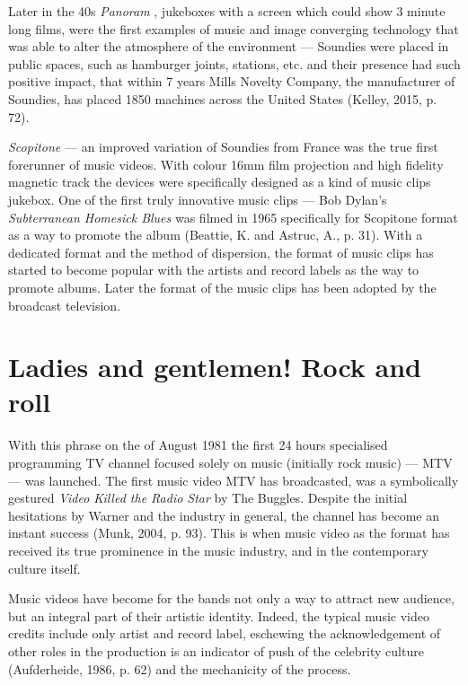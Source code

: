 \documentclass[a4paper, 11pt]{article}
\begin{document}
Later in the 40s \textit{Panoram }, jukeboxes with a screen which could show 3 minute long films, were the first examples of music and image converging technology that was able to alter the atmosphere of the environment — Soundies were placed in public spaces, such as hamburger joints, stations, etc. and their presence had such positive impact, that within 7 years Mills Novelty Company, the manufacturer of Soundies, has placed 1850 machines across the United States (Kelley, 2015, p. 72).

\textit{Scopitone} — an improved variation of Soundies from France was the true first forerunner of music videos. With colour 16mm film projection and high fidelity magnetic track the devices were specifically designed as a kind of music clips jukebox. One of the first truly innovative music clips — Bob Dylan’s \textit{Subterranean Homesick Blues} was filmed in 1965 specifically for Scopitone format as a way to promote the album (Beattie, K. and Astruc, A., p. 31). With a dedicated format and the method of dispersion, the format of music clips has started to become popular with the artists and record labels as the way to promote albums. Later the format of the music clips has been adopted by the broadcast television.


\section{Ladies and gentlemen! Rock and roll}

With this phrase on the  of August 1981 the first 24 hours specialised programming TV channel focused solely on music (initially rock music) — MTV — was launched. The first music video MTV has broadcasted, was a symbolically gestured \textit{Video Killed the Radio Star} by The Buggles. Despite the initial hesitations by Warner and the industry in general, the channel has become an instant success (Munk, 2004, p. 93). This is when music video as the format has received its true prominence in the music industry, and in the contemporary culture itself.

 Music videos have become for the bands not only a way to attract new audience, but an integral part of their artistic identity. Indeed, the typical music video credits include only artist and record label, eschewing the acknowledgement of other roles in the production is an indicator of push of the celebrity culture (Aufderheide, 1986, p. 62) and the mechanicity of the process.
\end{document}

